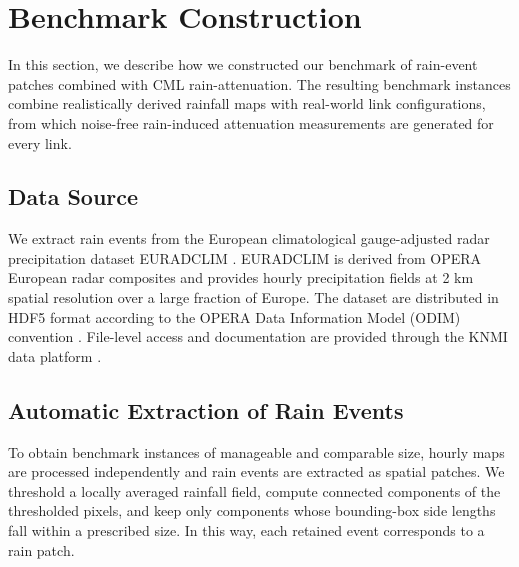 \documentclass[a4paper,fleqn]{cas-sc}
\newcommand{\notebox}[3]{%
  \begingroup
  \setlength{\fboxsep}{2pt}%
  \fcolorbox{#1}{#2}{\textsf{\footnotesize #3}}%
  \endgroup
}
\DeclareRobustCommand{\editnote}[1]{%
  \texorpdfstring{%
    \nobreak\hfill
    \mbox{\notebox{red!50!black}{red!10}{#1}}%
  }{}%
}
\renewcommand{\editnote}[1]{}
\begin{document}
\section{Benchmark Construction\editnote{GE:stable}}
In this section, we describe how we constructed our benchmark of rain-event patches combined with CML rain-attenuation.  The resulting benchmark instances combine realistically derived rainfall maps with real-world link configurations, from which noise-free rain-induced attenuation measurements are generated for every link.
\subsection{Data Source}
We extract rain events from the European climatological gauge-adjusted radar precipitation dataset EURADCLIM \citep{overeem2023euradclim}. EURADCLIM is derived from OPERA European radar composites and provides hourly precipitation fields at 2 \si{\kilo\meter} spatial resolution over a large fraction of Europe. The dataset are distributed in HDF5 format according to the OPERA Data Information Model (ODIM) convention \citep{odimh5}. File-level access and documentation are provided through the KNMI data platform \citep{knmi_euradclim_project}.

\subsection{Automatic Extraction of Rain Events}
To obtain benchmark instances of manageable and comparable size, hourly maps are processed independently and rain events are extracted as spatial patches. We threshold a locally averaged rainfall field, compute connected components of the thresholded pixels, and keep only components whose bounding-box side lengths fall within a prescribed size. In this way, each retained event corresponds to a rain patch. \editnote{AK: mention size here}

\end{document}
